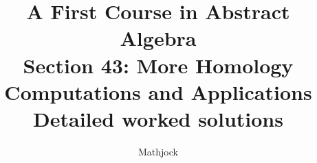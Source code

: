 
\title{\textbf{A First Course in Abstract Algebra}\\[0.3em]Section 43: More Homology Computations and Applications\\[0.3em]\large Detailed worked solutions}
\author{Mathjock}
\date{}

\maketitle
\bookinfo
\tableofcontents
\clearpage
\renewcommand{\thesection}{43}
\renewcommand{\theHsection}{fraleigh.43}


